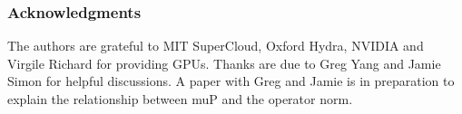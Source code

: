\subsubsection*{Acknowledgments} 

The authors are grateful to MIT SuperCloud, Oxford Hydra, NVIDIA and Virgile Richard for providing GPUs. Thanks are due to Greg Yang and Jamie Simon for helpful discussions. A paper with Greg and Jamie is in preparation to explain the relationship between muP \citep{Yang2021TensorPI} and the operator norm.